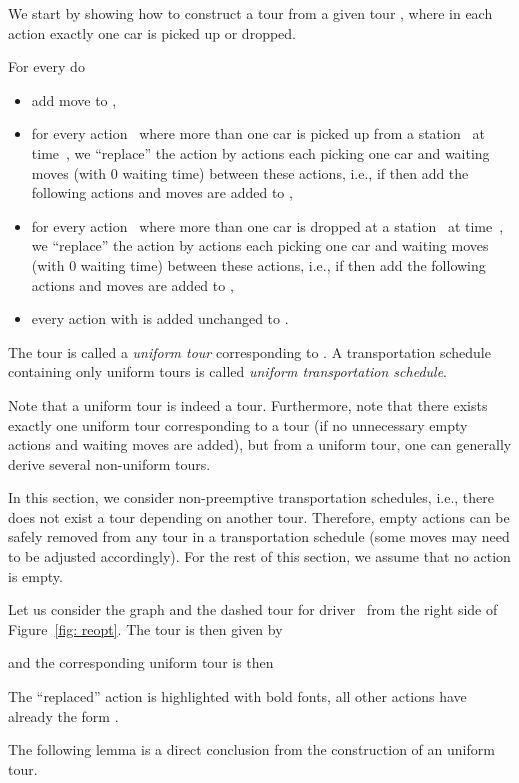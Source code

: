 \documentclass[english]{llncs}
\numberwithin{sublemma}{lemma}
\begin{document}
We start by showing how to construct a tour  from a given tour , where in each action exactly one car is picked up or dropped.

For every  do
\begin{itemize}
 \item add move  to ,
 \item for every action~ where more than one car is picked up from a station~ at time~, we ``replace'' the action by actions each picking one car and waiting moves (with 0 waiting time) between these actions,
       i.e., if  then add the following  actions and  moves 
        are added to ,
 \item for every action~ where more than one car is dropped at a station~ at time~, we ``replace'' the action by actions each picking one car and waiting moves (with 0 waiting time) between these actions,
       i.e., if  then add the following  actions and  moves 
        are added to ,
 \item every action  with  is added unchanged to .
\end{itemize}
The tour  is called a \emph{uniform tour} corresponding to .
A transportation schedule containing only uniform tours is called \emph{uniform transportation schedule}.


Note that a uniform tour is indeed a tour.
Furthermore, note that there exists exactly one uniform tour corresponding to a tour (if no unnecessary empty actions and waiting moves are added), but from a uniform tour, one can generally derive several non-uniform tours.

In this section, we consider non-preemptive transportation schedules, i.e., there does not exist a tour depending on another tour.
Therefore, empty actions can be safely removed from any tour in a transportation schedule (some moves may need to be adjusted accordingly).
For the rest of this section, we assume that no action is empty.


\begin{example}\label{ex: static: reopt: uniform tour}
Let us consider the graph and the dashed tour for driver~ from the right side of Figure~\ref{fig: reopt}.
The tour is then given by

and the corresponding uniform tour is then

The ``replaced'' action is highlighted with bold fonts, all other actions  have already the form .
\end{example}



The following lemma is a direct conclusion from the construction of an uniform tour.
\end{document}

